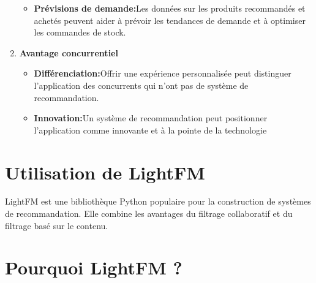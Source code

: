 \documentclass[edit,12pt,a4paper,ChapStyle,oneside,doubleinterligne]{report}
\begin{document}
\begin{enumerate}
\begin{itemize}
        \item \textbf{Prévisions de demande:}Les données sur les produits recommandés et achetés peuvent aider à prévoir les tendances de demande et à optimiser les commandes de stock.
    \end{itemize}
    \item \textbf{Avantage concurrentiel} \begin{itemize}
        \item \textbf{Différenciation:}Offrir une expérience personnalisée peut distinguer l'application des concurrents qui n'ont pas de système de recommandation.
        \item \textbf{Innovation:}Un système de recommandation peut positionner l'application comme innovante et à la pointe de la technologie
    \end{itemize}
\end{enumerate}
\section{Utilisation de LightFM}
LightFM est une bibliothèque Python populaire pour la construction de systèmes de recommandation. Elle combine les avantages du filtrage collaboratif et du filtrage basé sur le contenu.
\section{Pourquoi LightFM ?}
\end{document}
